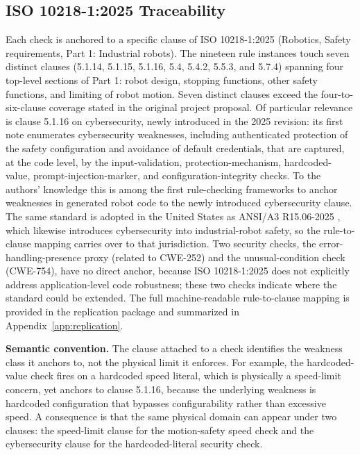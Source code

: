 \documentclass{ieeeaccess}
\begin{document}
\subsection{ISO 10218-1:2025 Traceability}\label{sec:iso}
Each check is anchored to a specific clause of ISO 10218-1:2025 (Robotics, Safety
requirements, Part 1: Industrial robots). The nineteen rule instances touch seven
distinct clauses (5.1.14, 5.1.15, 5.1.16, 5.4, 5.4.2, 5.5.3, and 5.7.4) spanning four
top-level sections of Part 1: robot design, stopping functions, other safety
functions, and limiting of robot motion. Seven distinct clauses exceed the
four-to-six-clause coverage stated in the original project proposal. Of particular
relevance is clause 5.1.16 on cybersecurity, newly introduced in the 2025 revision:
its first note enumerates cybersecurity weaknesses, including authenticated protection
of the safety configuration and avoidance of default credentials, that are captured, at the code level, by the input-validation, protection-mechanism, hardcoded-value,
prompt-injection-marker, and configuration-integrity checks. To the authors' knowledge
this is among the first rule-checking frameworks to anchor weaknesses in generated
robot code to the newly introduced cybersecurity clause. The same standard is adopted in the United States as ANSI/A3 R15.06-2025 \cite{ref66}, which likewise introduces cybersecurity into industrial-robot safety, so the rule-to-clause mapping carries over to that jurisdiction. Two security checks, the
error-handling-presence proxy (related to CWE-252) and the unusual-condition check (CWE-754), have no
direct anchor, because ISO 10218-1:2025 does not explicitly address application-level
code robustness; these two checks indicate where the standard could be extended. The
full machine-readable rule-to-clause mapping is provided in the replication package
and summarized in Appendix~\ref{app:replication}.

\textbf{Semantic convention.} The clause attached to a check identifies the weakness
class it anchors to, not the physical limit it enforces. For example, the
hardcoded-value check fires on a hardcoded speed literal, which is physically a
speed-limit concern, yet anchors to clause 5.1.16, because the underlying weakness is
hardcoded configuration that bypasses configurability rather than excessive speed. A
consequence is that the same physical domain can appear under two clauses: the
speed-limit clause for the motion-safety speed check and the cybersecurity clause for
the hardcoded-literal security check.
\end{document}
